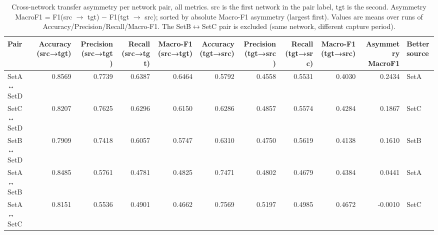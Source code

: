 \begin{table}
\caption{Cross-network transfer asymmetry per network pair, all metrics. src is the first network in the pair label, tgt is the second. Asymmetry MacroF1 = F1(src $\to$ tgt) $-$ F1(tgt $\to$ src); sorted by absolute Macro-F1 asymmetry (largest first). Values are means over runs of Accuracy/Precision/Recall/Macro-F1. The SetB$\leftrightarrow$SetC pair is excluded (same network, different capture period).}
\label{tab:q4_appendix_pair_asymmetry}
\begin{tabular}{lrrrrrrrrrl}
\toprule
Pair & Accuracy (src→tgt) & Precision (src→tgt) & Recall (src→tgt) & Macro-F1 (src→tgt) & Accuracy (tgt→src) & Precision (tgt→src) & Recall (tgt→src) & Macro-F1 (tgt→src) & Asymmetry MacroF1 & Better source \\
\midrule
SetA ↔ SetD & 0.8569 & 0.7739 & 0.6387 & 0.6464 & 0.5792 & 0.4558 & 0.5531 & 0.4030 & 0.2434 & SetA \\
SetC ↔ SetD & 0.8207 & 0.7625 & 0.6296 & 0.6150 & 0.6286 & 0.4857 & 0.5574 & 0.4284 & 0.1867 & SetC \\
SetB ↔ SetD & 0.7909 & 0.7418 & 0.6057 & 0.5747 & 0.6310 & 0.4750 & 0.5619 & 0.4138 & 0.1610 & SetB \\
SetA ↔ SetB & 0.8485 & 0.5761 & 0.4781 & 0.4825 & 0.7471 & 0.4802 & 0.4679 & 0.4384 & 0.0441 & SetA \\
SetA ↔ SetC & 0.8151 & 0.5536 & 0.4901 & 0.4662 & 0.7569 & 0.5197 & 0.4985 & 0.4672 & -0.0010 & SetC \\
\bottomrule
\end{tabular}
\end{table}
